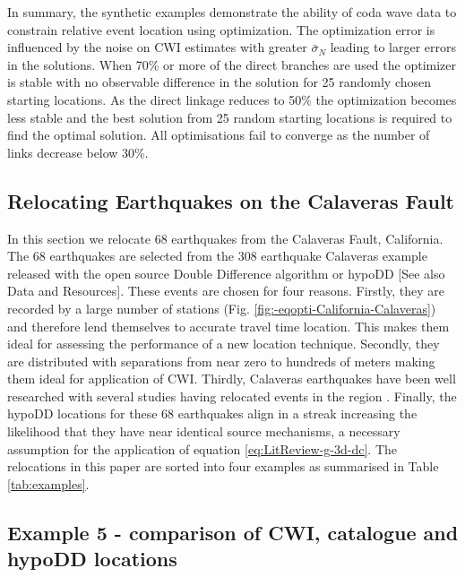 \documentclass[12pt,double]{article}
\begin{document}
In summary, the synthetic examples demonstrate the ability of coda
wave data to constrain relative event location using optimization.
The optimization error is influenced by the noise on CWI estimates
with greater $\bar{\sigma}_N$ leading to larger errors in the
solutions. When 70\% or more of the direct branches are used the
optimizer is stable with no observable difference in the solution
for 25 randomly chosen starting locations. As the direct linkage
reduces to 50\% the optimization becomes less stable and the best
solution from 25 random starting locations is required to find the
optimal solution. All optimisations fail to converge as the number
of links decrease below 30\%.

\vspace{2em}
\begin{centering}
\section*{Relocating Earthquakes on the Calaveras Fault}
\end{centering}
\label{sec:CalaverasLoc-CWIonly}

In this section we relocate 68 earthquakes from the Calaveras Fault,
California. The 68 earthquakes are selected from the 308 earthquake
Calaveras example released with the open source Double Difference
algorithm or hypoDD \citep{dr_Waldhauser00a, dr_Waldhauser01a} [See
also Data and Resources]. These events are chosen for four
reasons. Firstly, they are recorded by a large number of stations
(Fig. \ref{fig:-eqopti-California-Calaveras}) and therefore lend
themselves to accurate travel time location. This makes them ideal
for assessing the performance of a new location technique. Secondly,
they are distributed with separations from near zero to hundreds of
meters making them ideal for application of CWI. Thirdly, Calaveras
earthquakes have been well researched with several studies having
relocated events in the region \citep{dr_Waldhauser01a,
dr_Schaff02a, dr_Waldhauser08a}. Finally, the hypoDD locations for
these 68 earthquakes align in a streak increasing the likelihood
that they have near identical source mechanisms, a necessary
assumption for the application of equation
\ref{eq:LitReview-g-3d-dc}. The relocations in this paper are sorted
into four examples as summarised in Table \ref{tab:examples}.

\subsection*{Example 5 - comparison of CWI, catalogue and hypoDD locations}
\end{document}
